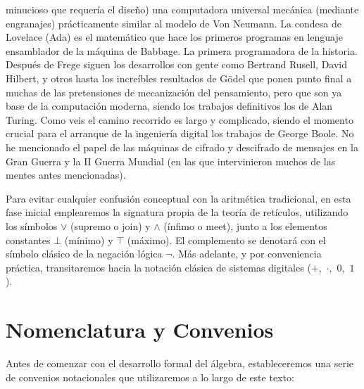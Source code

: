minucioso que requería el diseño) una computadora universal mecánica (mediante engranajes) prácticamente similar al modelo de Von Neumann. La condesa de Lovelace (Ada) es el matemático que hace los primeros programas en lenguaje ensamblador de la máquina de Babbage. La primera programadora de la historia. Después de Frege siguen los desarrollos con gente como Bertrand Rusell, David Hilbert, y otros hasta los increíbles resultados de Gödel que ponen punto final a muchas de las pretensiones de mecanización del pensamiento, pero que son ya base de la computación moderna, siendo los trabajos definitivos los de Alan Turing. Como veis el camino recorrido es largo y complicado, siendo el momento crucial para el arranque de la ingeniería digital los trabajos de George Boole. No he mencionado el papel de las máquinas de cifrado y descifrado de mensajes en la Gran Guerra y la II Guerra Mundial (en las que intervinieron muchos de las mentes antes mencionadas).

Para evitar cualquier confusión conceptual con la aritmética tradicional, en esta fase inicial emplearemos la signatura propia de la teoría de retículos, utilizando los símbolos $\vee$ (supremo o join) y $\wedge$ (ínfimo o meet), junto a los elementos constantes $\bot$ (mínimo) y $\top$ (máximo). El complemento se denotará con el símbolo clásico de la negación lógica $\neg.$ Más adelante, y por conveniencia práctica, transitaremos hacia la notación clásica de sistemas digitales ($+,$ $\cdot,$ $0,$ $1$).

\section{Nomenclatura y Convenios}
Antes de comenzar con el desarrollo formal del álgebra, estableceremos una serie de convenios notacionales que utilizaremos a lo largo de este texto:

